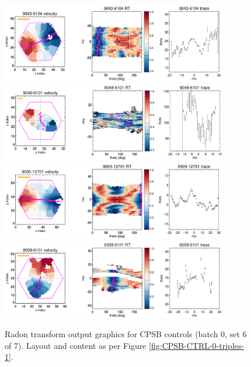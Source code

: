 \documentclass[fleqn,usenatbib]{mnras}
\begin{document}
\begin{figure}
    \centering
    \includegraphics[width=0.88\textwidth]{Images/SN1-MC250/CPSB-CTRL-triples/CPSB-CTRL-9043-6104-1-250.png}
    \includegraphics[width=0.88\textwidth]{Images/SN1-MC250/CPSB-CTRL-triples/CPSB-CTRL-9048-6101-1-250.png}
    \includegraphics[width=0.88\textwidth]{Images/SN1-MC250/CPSB-CTRL-triples/CPSB-CTRL-9505-12701-1-250.png}
    \includegraphics[width=0.88\textwidth]{Images/SN1-MC250/CPSB-CTRL-triples/CPSB-CTRL-9509-9101.png}    
    \caption{Radon transform output graphics for CPSB controls (batch 0, set 6 of 7). Layout and content as per Figure \ref{fig:CPSB-CTRL-0-triples-1}.}
    \label{fig:CPSB-CTRL-0-triples-6}
\end{figure}
\end{document}
